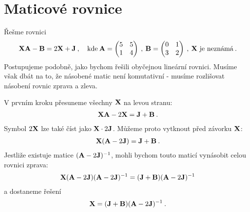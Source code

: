\section*{Maticové rovnice}

\begin{example}
    Řešme rovnici
    \begin{align}
        \mathbf{X} \mathbf{A} - \mathbf{B} = 2 \mathbf{X} + \mathbf{J} \:,
        \quad \text{kde} \:
        \mathbf{A} = \begin{pmatrix}
            5 & 5 \\ 1 & 4 
        \end{pmatrix} \:,\:
        \mathbf{B} = \begin{pmatrix}
            0 & 1 \\ 3 & 2 
        \end{pmatrix} \:,\: \mathbf{X} \text{ je neznámá}\:.
    \end{align}
    Postupujeme podobně, jako bychom řešili obyčejnou lineární rovnici. Musíme však dbát na to, že násobené matic není komutativní - musíme rozlišovat násobení rovnic zprava a zleva.

    V prvním kroku přesuneme všechny $\mathbf{X}$ na levou stranu:
    \begin{align}
        \mathbf{X} \mathbf{A} - 2 \mathbf{X} = \mathbf{J} + \mathbf{B} \:. 
    \end{align}
    Symbol $2 \mathbf{X}$ lze také číst jako $\mathbf{X} \cdot 2 \mathbf{J}$. Můžeme proto vytknout před závorku $\mathbf{X}$:
    \begin{align}
        \mathbf{X} (\mathbf{A} - 2 \mathbf{J}) = \mathbf{J} + \mathbf{B} \:.
    \end{align}
    Jestliže existuje matice $(\mathbf{A} - 2 \mathbf{J})^{-1}$, mohli bychom touto maticí vynásobit celou rovnici zprava:
    \begin{align}
        \mathbf{X} (\mathbf{A} - 2 \mathbf{J})(\mathbf{A} - 2 \mathbf{J})^{-1} = (\mathbf{J} + \mathbf{B})(\mathbf{A} - 2 \mathbf{J})^{-1}
    \end{align}
    a dostaneme řešení
    \begin{align}
        \mathbf{X} = (\mathbf{J} + \mathbf{B})(\mathbf{A} - 2 \mathbf{J})^{-1} \:.
    \end{align}


\end{example}
